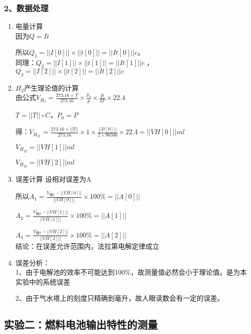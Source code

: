    \subsubsection*{2、数据处理}
    \begin{enumerate}
        \item 电量计算\\
        因为$Q=It$

        所以${Q}_{1}=||I[0]||\times||t[0]|| = ||It[0]||c$。\\
        \indent 同理：${Q}_{2}=||I[1]||\times||t[1]|| = ||It[1]||c$
        ，${Q}_{3}=||I[2]||\times||t[2]|| = ||It[2]||c$

        \item ${H}_{2}$产生理论值的计算\\
        由公式${V}_{{H}_{2}}=\frac{273.16+T}{273.16}\times\frac{{p}_{0}}{p}\times\frac{It}{2F}\times22.4$

        $T=||T||\circ C$，${P}_{0}=P$

        得：${V}_{{H}_{21}}=\frac{273.16+||T||}{273.16}\times1\times\frac{||It[0]||}{2\times96500}\times22.4 = ||VH[0]||ml$

        ${V}_{{H}_{22}} = ||VH[1]||ml$

        ${V}_{{H}_{23}} = ||VH[2]||ml$

        \item 误差计算
        设相对误差为A

        所以${A}_{1}=\frac{{V}_{\text{测1}}-||VH[0]||}{||VH[0]||}\times100\% = ||A[0]||$

        ${A}_{2}=\frac{{V}_{\text{测2}}-||VH[1]||}{||VH[1]||}\times100\% = ||A[1]||$

        ${A}_{3}=\frac{{V}_{\text{测3}}-||VH[2]||}{||VH[2]||}\times100\% = ||A[2]||$\\

        结论：在误差允许范围内，法拉第电解定律成立

        \item 误差分析：\\

        1、由于电解池的效率不可能达到100\%，故测量值必然会小于理论值。是为本实验中的系统误差

        2、由于气水塔上的刻度只精确到毫升，故人眼读数会有一定的误差。
    \end{enumerate}

    \subsection*{实验二：燃料电池输出特性的测量}
